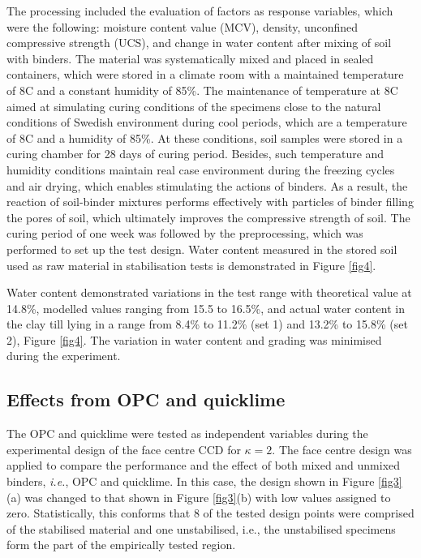 \documentclass[eprint,
]{actapoly}
\begin{document}
The processing included the evaluation of factors as response variables, which were the following: moisture content value (MCV), density, unconfined compressive strength (UCS), and change in water content after mixing of soil with binders. The material was systematically mixed and placed in sealed containers, which were stored in a climate room with a maintained temperature of 8\degree C and a constant humidity of 85\%. The maintenance of temperature at 8\degree C aimed at simulating curing conditions of the specimens close to the natural conditions of Swedish environment during cool periods, which are a temperature of 8\degree C and a humidity of 85\%. At these conditions, soil samples were stored in a curing chamber for 28 days of curing period. Besides, such temperature and humidity conditions maintain real case environment during the freezing cycles and air drying, which enables stimulating the actions of binders. As a result, the reaction of soil-binder mixtures performs effectively with particles of binder filling the pores of soil, which ultimately improves the compressive strength of soil. The curing period of one week was followed by the preprocessing, which was performed to set up the test design. Water content measured in the stored soil used as raw material in stabilisation tests is demonstrated in Figure \ref{fig4}. 

Water content demonstrated variations in the test range with theoretical value at 14.8\%, modelled values ranging from 15.5 to 16.5\%, and actual water content in the clay till lying in a range from 8.4\% to 11.2\% (set 1) and 13.2\% to 15.8\% (set 2), Figure \ref{fig4}. The variation in water content and grading was minimised during the experiment.

\subsection{Effects from OPC and quicklime}
The OPC and quicklime were tested as independent variables during the  experimental design of the face centre CCD for $\kappa=2$. The face centre design was applied to compare the performance and the effect of both mixed and unmixed binders, \emph{i.e.}, OPC and quicklime. In this case, the design shown in Figure \ref{fig3}(a) was changed to that shown in Figure \ref{fig3}(b) with low values assigned to zero. Statistically, this conforms that 8 of the tested design points were comprised of the stabilised material and one unstabilised, i.e., the unstabilised specimens form the part of the empirically tested region. 
\end{document}
